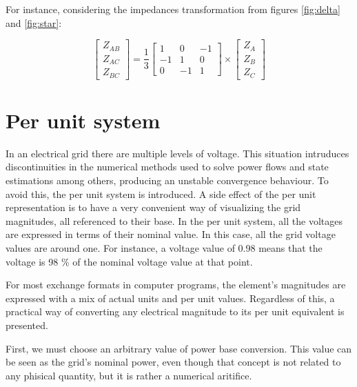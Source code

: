 \documentclass{tufte-book}
\begin{document}
For instance, considering the impedances transformation from figures \ref{fig:delta} and \ref{fig:star}:

\begin{equation}
\left[ \begin{array}{c}
Z_{AB} \\
Z_{AC} \\
Z_{BC}
\end{array} \right] = \frac{1}{3} \left[ \begin{array}{ccc}
1 & 0 & -1 \\
-1 & 1 & 0 \\
0 & -1 & 1
\end{array} \right] \times \left[ \begin{array}{c}
Z_A \\
Z_B \\
Z_C
\end{array} \right]
\end{equation}




\section{Per unit system}

In an electrical grid there are multiple levels of voltage. This situation intruduces discontinuities in the numerical methods used to solve power flows and state estimations among others, producing an unstable convergence behaviour. To avoid this, the per unit system is introduced. A side effect of the per unit representation is to have a very convenient way of visualizing the grid magnitudes, all referenced to their base. In the per unit system, all the voltages are expressed in terms of their nominal value. In this case, all the grid voltage values are around one. For instance, a voltage value of 0.98 means that the voltage is 98 \% of the nominal voltage value at that point.

For most exchange formats in computer programs, the element's magnitudes are expressed with a mix of actual units and per unit values. Regardless of this, a practical way of converting any electrical magnitude to its per unit equivalent is presented.

First, we must choose an arbitrary value of power base conversion. This value can be seen as the grid's nominal power, even though that concept is not related to any phisical quantity, but it is rather a numerical aritifice. 

\end{document}
